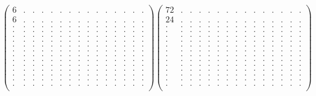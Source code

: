 \documentclass[12pt,a4paper]{amsart}
\begin{document}
\begin{align*}
\left(\begin{array}{rrrrrrrrrrrrrrr}%
6&.&.&.&.&.&.&.&.&.&.&.&.&.&.\\%
6&.&.&.&.&.&.&.&.&.&.&.&.&.&.\\%
.&.&.&.&.&.&.&.&.&.&.&.&.&.&.\\%
.&.&.&.&.&.&.&.&.&.&.&.&.&.&.\\%
.&.&.&.&.&.&.&.&.&.&.&.&.&.&.\\%
.&.&.&.&.&.&.&.&.&.&.&.&.&.&.\\%
.&.&.&.&.&.&.&.&.&.&.&.&.&.&.\\%
.&.&.&.&.&.&.&.&.&.&.&.&.&.&.\\%
.&.&.&.&.&.&.&.&.&.&.&.&.&.&.\\%
.&.&.&.&.&.&.&.&.&.&.&.&.&.&.\\%
.&.&.&.&.&.&.&.&.&.&.&.&.&.&.\\%
.&.&.&.&.&.&.&.&.&.&.&.&.&.&.\\%
.&.&.&.&.&.&.&.&.&.&.&.&.&.&.\\%
.&.&.&.&.&.&.&.&.&.&.&.&.&.&.\\%
.&.&.&.&.&.&.&.&.&.&.&.&.&.&.\\%
\end{array}\right)%
\left(\begin{array}{rrrrrrrrrrrrrrr}%
72&.&.&.&.&.&.&.&.&.&.&.&.&.&.\\%
24&.&.&.&.&.&.&.&.&.&.&.&.&.&.\\%
.&.&.&.&.&.&.&.&.&.&.&.&.&.&.\\%
.&.&.&.&.&.&.&.&.&.&.&.&.&.&.\\%
.&.&.&.&.&.&.&.&.&.&.&.&.&.&.\\%
.&.&.&.&.&.&.&.&.&.&.&.&.&.&.\\%
.&.&.&.&.&.&.&.&.&.&.&.&.&.&.\\%
.&.&.&.&.&.&.&.&.&.&.&.&.&.&.\\%
.&.&.&.&.&.&.&.&.&.&.&.&.&.&.\\%
.&.&.&.&.&.&.&.&.&.&.&.&.&.&.\\%
.&.&.&.&.&.&.&.&.&.&.&.&.&.&.\\%
.&.&.&.&.&.&.&.&.&.&.&.&.&.&.\\%
.&.&.&.&.&.&.&.&.&.&.&.&.&.&.\\%
.&.&.&.&.&.&.&.&.&.&.&.&.&.&.\\%
.&.&.&.&.&.&.&.&.&.&.&.&.&.&.\\%
\end{array}\right)%
\end{align*}
\end{document}
